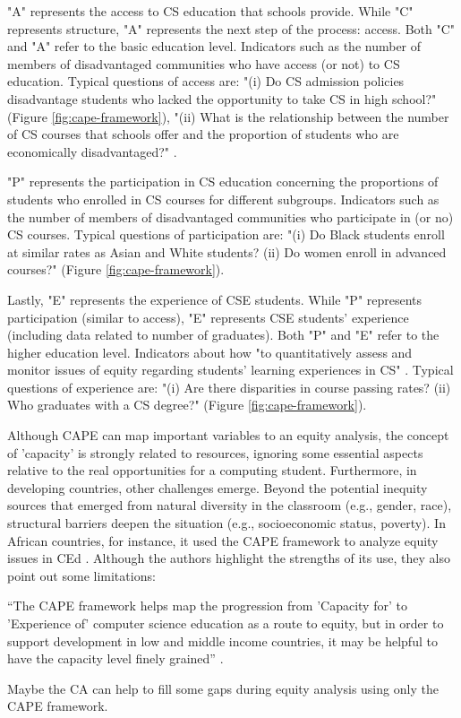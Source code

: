 "A" represents the access to \gls{CS} education that schools provide. While "C" represents structure, "A" represents the next step of the process: access. Both "C" and "A" refer to the basic education level. Indicators such as the number of members of disadvantaged communities who have access (or not) to \gls{CS} education. Typical questions of access are: "(i) Do \gls{CS} admission policies disadvantage students who lacked the opportunity to take \gls{CS} in high school?" (Figure \ref{fig:cape-framework}), "(ii) What is the relationship between the number of \gls{CS} courses that schools offer and the proportion of students who are economically disadvantaged?" \cite[p.~10]{warner:2022}.

"P" represents the participation in \gls{CS} education concerning the proportions of students who enrolled in \gls{CS} courses for different subgroups. Indicators such as the number of members of disadvantaged communities who participate in (or no) \gls{CS} courses. Typical questions of participation are: "(i) Do Black students enroll at similar rates as Asian and White students? (ii) Do women enroll in advanced courses?" (Figure \ref{fig:cape-framework}). 

Lastly, "E" represents the experience of \gls{CSE} students. While "P" represents participation (similar to access), "E" represents \gls{CSE} students' experience (including data related to number of graduates). Both "P" and "E" refer to the higher education level. Indicators about how "to quantitatively assess and monitor issues of equity regarding students’ learning experiences in \gls{CS}" \cite[p.~5]{warner:2022}. Typical questions of experience are: "(i) Are there disparities in course passing rates? (ii) Who graduates with a \gls{CS} degree?" (Figure \ref{fig:cape-framework}).

Although \gls{CAPE} can map important variables to an equity analysis, the concept
of 'capacity' is strongly related to resources, ignoring some essential aspects relative to the real opportunities for a computing student. Furthermore, in developing countries, other challenges emerge. Beyond the potential inequity sources that emerged from natural diversity in the classroom (e.g., gender, race), structural barriers deepen the situation (e.g., socioeconomic status, poverty). In African countries, for instance, it used the \gls{CAPE} framework to analyze equity issues in \gls{CEd} \cite{tshukudu:2023}. Although the authors highlight the strengths of its use, they also point out some limitations: 
\begin{citacao}
    ``The \gls{CAPE} framework helps map the progression from 'Capacity for' to 'Experience of' computer science education as a route to equity, but in order to support development in low and middle income countries, it may be helpful to have the capacity level finely grained'' \cite[p.~1]{tshukudu:2023}.
\end{citacao}
Maybe the \gls{CA} can help to fill some gaps during equity analysis using only the \gls{CAPE} framework. 